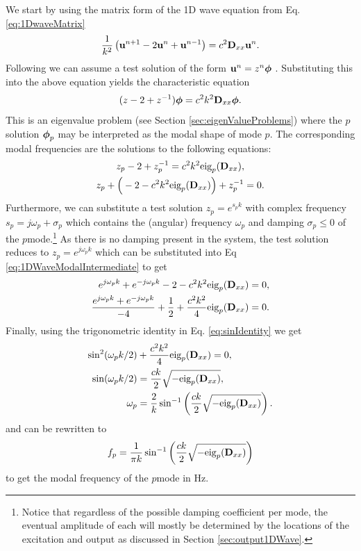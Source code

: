 {{We start by using the matrix form of the 1D wave equation from Eq. \eqref{eq:1DwaveMatrix}
\begin{equation*}
    \frac{1}{k^2}\left(\mathbf{u}^{n+1}-2\mathbf{u}^n+\mathbf{u}^{n-1}\right) = c^2 \mathbf{D}_{xx}\mathbf{u}^n.
\end{equation*}
Following \cite{theBible} we can assume a test solution of the form $\mathbf{u}^n = z^n\boldsymbol{\phi}$ . Substituting this into the above equation yields the characteristic equation
\begin{equation}
    (z - 2 + z^{-1})\boldsymbol{\phi} = c^2k^2\mathbf{D}_{xx} \boldsymbol{\phi}.
\end{equation}
This is an eigenvalue problem (see Section \ref{sec:eigenValueProblems}) where the $p$\th solution $\boldsymbol{\phi}_p$ may be interpreted as the modal shape of mode $p$. The corresponding modal frequencies are the solutions to the following equations:
\begin{gather}\label{eq:1DWaveModalIntermediate}
    z_p-2+z_p^{-1} = c^2k^2\text{eig}_p(\mathbf{D}_{xx}),\nonumber\\
    z_p+\Big(-2-c^2k^2\text{eig}_p(\mathbf{D}_{xx})\Big)+z_p^{-1}=0.
\end{gather}
Furthermore, we can substitute a test solution $z_p = e^{s_pk}$ with complex frequency $s_p = j\omega_p + \sigma_p$ which contains the (angular) frequency $\omega_p$ and damping $\sigma_p \leq 0$  of the $p$\th mode.\footnote{Notice that regardless of the possible damping coefficient per mode, the eventual amplitude of each will mostly be determined by the locations of the excitation and output as discussed in Section \ref{sec:output1DWave}.} As there is no damping present in the system, the test solution reduces to $z_p = e^{j\omega_p k}$ which can be substituted into Eq \eqref{eq:1DWaveModalIntermediate} to get
\begin{align*}
    e^{j\omega_pk}+e^{-j\omega_pk}-2-c^2k^2\text{eig}_p(\mathbf{D}_{xx})&=0,\\
    \frac{e^{j\omega_pk}+e^{-j\omega_pk}}{-4}+\frac{1}{2}+\frac{c^2k^2}{4}\text{eig}_p(\mathbf{D}_{xx})&=0.
\end{align*}
Finally, using the trigonometric identity in Eq. \eqref{eq:sinIdentity} we get
\begin{align}
    \sin^2(\omega_pk/2)&+\frac{c^2k^2}{4}\text{eig}_p(\mathbf{D}_{xx})=0,\nonumber\\
    \sin(\omega_pk/2)&=\frac{ck}{2}\sqrt{-\text{eig}_p(\mathbf{D}_{xx})},\nonumber\\
    \omega_p &= \frac{2}{k}\sin^{-1}\left(\frac{ck}{2}\sqrt{-\text{eig}_p(\mathbf{D}_{xx})}\right).\label{eq:1DWaveModesAngular}
\end{align}
and can be rewritten to 
\begin{equation}
    f_p = \frac{1}{\pi k}\sin^{-1}\left(\frac{ck}{2}\sqrt{-\text{eig}_p(\mathbf{D}_{xx})}\right)\label{eq:1DWaveModes}
\end{equation}
to get the modal frequency of the $p$\th mode in Hz. 

}}
